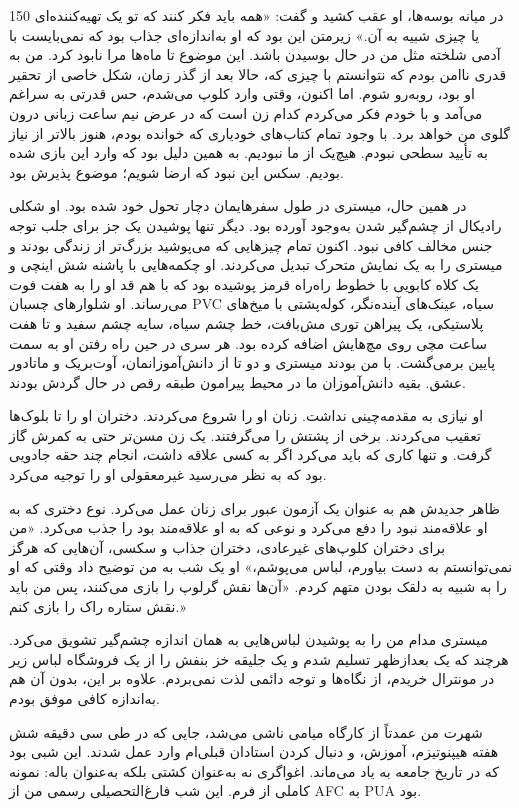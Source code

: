 150
در میانه بوسه‌ها، او عقب کشید و گفت: «همه باید فکر کنند که تو یک تهیه‌کننده‌ای یا چیزی شبیه به آن.» زیرمتن این بود که او به‌اندازه‌ای جذاب بود که نمی‌بایست با آدمی شلخته مثل من در حال بوسیدن باشد. این موضوع تا ماه‌ها مرا نابود کرد. من به قدری ناامن بودم که نتوانستم با چیزی که، حالا بعد از گذر زمان، شکل خاصی از تحقیر او بود، روبه‌رو شوم. اما اکنون، وقتی وارد کلوپ می‌شدم، حس قدرتی به سراغم می‌آمد و با خودم فکر می‌کردم کدام زن است که در عرض نیم ساعت زبانی درون گلوی من خواهد برد. با وجود تمام کتاب‌های خودیاری که خوانده بودم، هنوز بالاتر از نیاز به تأیید سطحی نبودم. هیچ‌یک از ما نبودیم. به همین دلیل بود که وارد این بازی شده بودیم. سکس این نبود که ارضا شویم؛ موضوع پذیرش بود.

در همین حال، میستری در طول سفرهایمان دچار تحول خود شده بود. او شکلی رادیکال از چشم‌گیر شدن به‌وجود آورده بود. دیگر تنها پوشیدن یک جز برای جلب توجه جنس مخالف کافی نبود. اکنون تمام چیزهایی که می‌پوشید بزرگ‌تر از زندگی بودند و میستری را به یک نمایش متحرک تبدیل می‌کردند. او چکمه‌هایی با پاشنه شش‌ اینچی و یک کلاه کابویی با خطوط راه‌راه قرمز پوشیده بود که با هم قد او را به هفت فوت می‌رساند. او شلوارهای چسبان PVC سیاه، عینک‌های آینده‌نگر، کوله‌پشتی با میخ‌های پلاستیکی، یک پیراهن توری مش‌بافت، خط چشم سیاه، سایه چشم سفید و تا هفت ساعت مچی روی مچ‌هایش اضافه کرده بود. هر سری در حین راه رفتن او به سمت پایین برمی‌گشت. با من بودند میستری و دو تا از دانش‌آموزانمان، آوت‌بریک و ماتادور عشق. بقیه دانش‌آموزان ما در محیط پیرامون طبقه رقص در حال گردش بودند.

او نیازی به مقدمه‌چینی نداشت. زنان او را شروع می‌کردند. دختران او را تا بلوک‌ها تعقیب می‌کردند. برخی از پشتش را می‌گرفتند. یک زن مسن‌تر حتی به کمرش گاز گرفت. و تنها کاری که باید می‌کرد اگر به کسی علاقه داشت، انجام چند حقه جادویی بود که به نظر می‌رسید غیرمعقولی او را توجیه می‌کرد. 

ظاهر جدیدش هم به عنوان یک آزمون عبور برای زنان عمل می‌کرد. نوع دختری که به او علاقه‌مند نبود را دفع می‌کرد و نوعی که به او علاقه‌مند بود را جذب می‌کرد. «من برای دختران کلوپ‌های غیرعادی، دختران جذاب و سکسی، آن‌هایی که هرگز نمی‌توانستم به دست بیاورم، لباس می‌پوشم،» او یک شب به من توضیح داد وقتی که او را به شبیه به دلقک بودن متهم کردم. «آن‌ها نقش گرلوپ را بازی می‌کنند، پس من باید نقش ستاره راک را بازی کنم.» 

میستری مدام من را به پوشیدن لباس‌هایی به همان اندازه چشم‌گیر تشویق می‌کرد. هرچند که یک بعدازظهر تسلیم شدم و یک جلیقه خز بنفش را از یک فروشگاه لباس‌ زیر در مونترال خریدم، از نگاه‌ها و توجه دائمی لذت نمی‌بردم. علاوه بر این، بدون آن هم به‌اندازه کافی موفق بودم.

شهرت من عمدتاً از کارگاه میامی ناشی می‌شد، جایی که در طی سی دقیقه شش هفته هیپنوتیزم، آموزش، و دنبال کردن استادان قبلی‌ام وارد عمل شدند. این شبی بود که در تاریخ جامعه به یاد می‌ماند. اغواگری نه به‌عنوان کشتی بلکه به‌عنوان باله: نمونه کاملی از فرم. این شب فارغ‌التحصیلی رسمی من از AFC به PUA بود.

